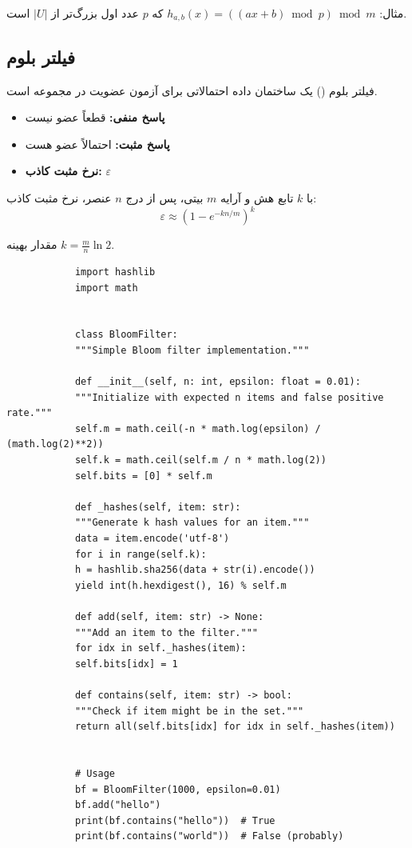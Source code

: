 \documentclass{matinbook}
\begin{document}
    مثال: $h_{a,b}(x) = ((ax + b) \bmod p) \bmod m$
    که $p$ عدد اول بزرگ‌تر از $|U|$ است.
    
    \subsection{فیلتر بلوم}
    
    \begin{definition}
        فیلتر بلوم
        () یک ساختمان داده
        احتمالاتی برای آزمون عضویت در مجموعه است.
        \begin{itemize}
            \item \textbf{پاسخ منفی:} قطعاً عضو نیست
            \item \textbf{پاسخ مثبت:} احتمالاً عضو هست
            \item \textbf{نرخ مثبت کاذب:} $\varepsilon$
        \end{itemize}
        \label{def:bloom-filter}
    \end{definition}
    
    با $k$ تابع هش و آرایه $m$ بیتی،
    پس از درج $n$ عنصر، نرخ مثبت کاذب:
    \[
    \varepsilon \approx \left(1 - e^{-kn/m}\right)^{k}
    \]
    
    مقدار بهینه $k = \frac{m}{n} \ln 2$.
    
    \begin{latin}
        \begin{verbatim}
            import hashlib
            import math
            
            
            class BloomFilter:
            """Simple Bloom filter implementation."""
            
            def __init__(self, n: int, epsilon: float = 0.01):
            """Initialize with expected n items and false positive rate."""
            self.m = math.ceil(-n * math.log(epsilon) / (math.log(2)**2))
            self.k = math.ceil(self.m / n * math.log(2))
            self.bits = [0] * self.m
            
            def _hashes(self, item: str):
            """Generate k hash values for an item."""
            data = item.encode('utf-8')
            for i in range(self.k):
            h = hashlib.sha256(data + str(i).encode())
            yield int(h.hexdigest(), 16) % self.m
            
            def add(self, item: str) -> None:
            """Add an item to the filter."""
            for idx in self._hashes(item):
            self.bits[idx] = 1
            
            def contains(self, item: str) -> bool:
            """Check if item might be in the set."""
            return all(self.bits[idx] for idx in self._hashes(item))
            
            
            # Usage
            bf = BloomFilter(1000, epsilon=0.01)
            bf.add("hello")
            print(bf.contains("hello"))  # True
            print(bf.contains("world"))  # False (probably)
        \end{verbatim}
    \end{latin}
    \label{code:bloom-filter}
    
\end{document}

